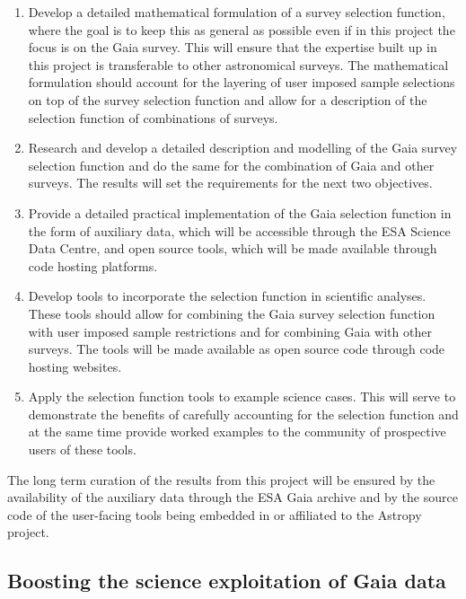 \begin{enumerate}
    \item Develop a detailed mathematical formulation of a survey selection function, where the goal is to keep this as general as possible even if in this project the focus is on the Gaia survey. This will ensure that the expertise built up in this project is transferable to other astronomical surveys. The mathematical formulation should account for the layering of user imposed sample selections on top of the survey selection function and allow for a description of the selection function of combinations of surveys.
    \item Research and develop a detailed description and modelling of the Gaia survey selection function and do the same for the combination of Gaia and other surveys. The results will set the requirements for the next two objectives.
    \item Provide a detailed practical implementation of the Gaia selection function in the form of auxiliary data, which will be accessible through the ESA Science Data Centre, and open source tools, which will be made available through code hosting platforms. 
    \item Develop tools to incorporate the selection function in scientific analyses. These tools should allow for combining the Gaia survey selection function with user imposed sample restrictions and for combining Gaia with other surveys. The tools will be made available as open source code through code hosting websites.
    \item Apply the selection function tools to example science cases. This will serve to demonstrate the benefits of carefully accounting for the selection function and at the same time provide worked examples to the community of prospective users of these tools.
\end{enumerate}

The long term curation of the results from this project will be ensured by the availability of the auxiliary data through the ESA Gaia archive and by the source code of the user-facing tools being embedded in or affiliated to the Astropy project.

\subsection{Boosting the science exploitation of Gaia data}
\label{sec:needforselectionfunction}

